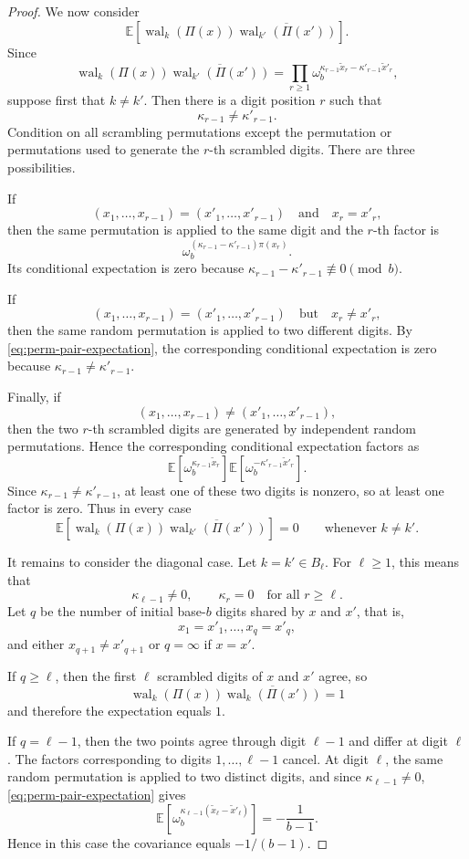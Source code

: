 \documentclass[11pt]{article}
\newcommand{\wal}{\operatorname{wal}}
\begin{document}
\begin{proof}
We now consider
\[
 \mathbb E\!\left[
   \wal_k(\Pi(x))
   \overline{\wal_{k'}(\Pi(x'))}
 \right].
\]
Since
\[
 \wal_k(\Pi(x))
 \overline{\wal_{k'}(\Pi(x'))}
 =
 \prod_{r\geq 1}
 \omega_b^{
   \kappa_{r-1}\widetilde x_r
   -
   \kappa'_{r-1}\widetilde x'_r
 },
\]
suppose first that \(k\neq k'\).  Then there is a digit position \(r\)
such that
\[
 \kappa_{r-1}\neq \kappa'_{r-1}.
\]
Condition on all scrambling permutations except the permutation or
permutations used to generate the \(r\)-th scrambled digits.  There are
three possibilities.

If
\[
 (x_1,\ldots,x_{r-1})=(x'_1,\ldots,x'_{r-1})
 \quad\text{and}\quad
 x_r=x'_r,
\]
then the same permutation is applied to the same digit and the
\(r\)-th factor is
\[
 \omega_b^{(\kappa_{r-1}-\kappa'_{r-1})\pi(x_r)}.
\]
Its conditional expectation is zero because
\(\kappa_{r-1}-\kappa'_{r-1}\not\equiv 0\pmod b\).

If
\[
 (x_1,\ldots,x_{r-1})=(x'_1,\ldots,x'_{r-1})
 \quad\text{but}\quad
 x_r\neq x'_r,
\]
then the same random permutation is applied to two different digits.
By \eqref{eq:perm-pair-expectation}, the corresponding conditional
expectation is zero because
\(\kappa_{r-1}\neq\kappa'_{r-1}\).

Finally, if
\[
 (x_1,\ldots,x_{r-1})\neq(x'_1,\ldots,x'_{r-1}),
\]
then the two \(r\)-th scrambled digits are generated by independent
random permutations.  Hence the corresponding conditional expectation
factors as
\[
 \mathbb E\!\left[
   \omega_b^{\kappa_{r-1}\widetilde x_r}
 \right]
 \mathbb E\!\left[
   \omega_b^{-\kappa'_{r-1}\widetilde x'_r}
 \right].
\]
Since
\(\kappa_{r-1}\neq\kappa'_{r-1}\), at least one of these two digits is
nonzero, so at least one factor is zero.  Thus in every case
\[
 \mathbb E\!\left[
   \wal_k(\Pi(x))
   \overline{\wal_{k'}(\Pi(x'))}
 \right]
 =0
 \qquad\text{whenever }k\neq k'.
\]

It remains to consider the diagonal case.  Let \(k=k'\in B_\ell\).
For \(\ell\geq 1\), this means that
\[
 \kappa_{\ell-1}\neq 0,
 \qquad
 \kappa_r=0
 \quad\text{for all }r\geq \ell.
\]
Let \(q\) be the number of initial base-\(b\) digits shared by \(x\)
and \(x'\), that is,
\[
 x_1=x'_1,\ldots,x_q=x'_q,
\]
and either \(x_{q+1}\neq x'_{q+1}\) or \(q=\infty\) if \(x=x'\).

If \(q\geq\ell\), then the first \(\ell\) scrambled digits of \(x\)
and \(x'\) agree, so
\[
 \wal_k(\Pi(x))
 \overline{\wal_k(\Pi(x'))}
 =1
\]
and therefore the expectation equals \(1\).

If \(q=\ell-1\), then the two points agree through digit
\(\ell-1\) and differ at digit \(\ell\).  The factors corresponding to
digits \(1,\ldots,\ell-1\) cancel.  At digit \(\ell\), the same random
permutation is applied to two distinct digits, and since
\(\kappa_{\ell-1}\neq 0\), \eqref{eq:perm-pair-expectation} gives
\[
 \mathbb E\!\left[
 \omega_b^{\kappa_{\ell-1}
   \left(\widetilde x_\ell-\widetilde x'_\ell\right)}
 \right]
 =
 -\frac{1}{b-1}.
\]
Hence in this case the covariance equals \(-1/(b-1)\).


\end{proof}
\end{document}
